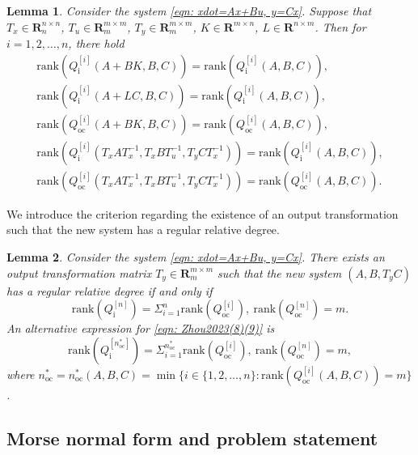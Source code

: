 \documentclass[sort&compress]{elsarticle}
\newtheorem{lemma}{Lemma}
\newcommand\nocstar{n_\mathrm{oc}^*}
\newcommand\Qi{Q_\mathrm i}
\newcommand\Qoc{Q_\mathrm{oc}}
\newcommand\rank{\mathrm{rank}}
\newcommand\R{\mathbf R}
\begin{document}
\begin{lemma}\label{thm: dont change Qi/oc}
\emph{\cite{Zhoubook}}
Consider the system \eqref{eqn: xdot=Ax+Bu, y=Cx}.
Suppose that $T_x\in\R^{n\times n}_n$, $T_u\in\R^{m\times m}_m$,
$T_y\in\R^{m\times m}_m$, $K\in\R^{m\times n}$, $L\in\R^{n\times m}$.
Then for $i=1,2,\dots,n$, there hold
\begin{gather}
\label{eqn: rank Qi A+BK}
\rank(\Qi^{[i]}(A+BK,B,C))=\rank(\Qi^{[i]}(A,B,C)),\\
\label{eqn: rank Qi A+LC}
\rank(\Qi^{[i]}(A+LC,B,C))=\rank(\Qi^{[i]}(A,B,C)),\\
\label{eqn: rank Qoc A+BK}
\rank(\Qoc^{[i]}(A+BK,B,C))=\rank(\Qoc^{[i]}(A,B,C)),\\
\label{eqn: rank Qi TxTuTy}
\rank(\Qi^{[i]}(T_xAT_x^{-1},T_xBT_u^{-1},T_yCT_x^{-1}))
=\rank(\Qi^{[i]}(A,B,C)),\\
\label{eqn: rank Qoc TxTuTy}
\rank(\Qoc^{[i]}(T_xAT_x^{-1},T_xBT_u^{-1},T_yCT_x^{-1}))
=\rank(\Qoc^{[i]}(A,B,C)).
\end{gather}
\end{lemma}

We introduce the criterion regarding the existence
of an output transformation such that the new system has a regular relative degree.

\begin{lemma}\label{thm: Zhou2023(8)(9)}
\emph{\cite{Zhou2023Auto[J]}}
Consider the system \eqref{eqn: xdot=Ax+Bu, y=Cx}.
There exists an output transformation matrix $T_y\in\R^{m\times m}_m$
such that the new system $(A,B,T_yC)$ has a regular relative
degree if and only if
\begin{equation}\label{eqn: Zhou2023(8)(9)}
\rank(\Qi^{[n]})
=\Sigma_{i=1}^n\rank(\Qoc^{[i]}),\
\rank(\Qoc^{[n]})=m.
\end{equation}
An alternative expression for \eqref{eqn: Zhou2023(8)(9)} is
\begin{equation}\label{eqn: Zhou2023(8)(9) n*}
\rank(\Qi^{[\nocstar]})
=\Sigma_{i=1}^{\nocstar}\rank(\Qoc^{[i]}),\
\rank(\Qoc^{[n]})=m,
\end{equation}
where
$\nocstar=\nocstar(A,B,C)=\min\big\{i\in\{1,2,\dots,n\}:\rank(\Qoc^{[i]}(A,B,C))=m\big\}$.
\end{lemma}

\subsection{Morse normal form and problem statement}
\end{document}

